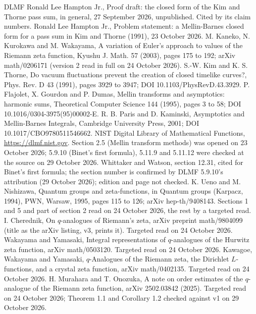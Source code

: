 \documentclass[11pt]{article}
\begin{document}
{\small\sloppy
\begin{thebibliography}{DLMF}
 Ronald Lee Hampton Jr., Proof draft: the closed form of the Kim and Thorne pass sum, in general, 27 September 2026, unpublished. Cited by its claim numbers.
 Ronald Lee Hampton Jr., Problem statement: a Mellin-Barnes closed form for a pass sum in Kim and Thorne (1991), 23 October 2026.
 M. Kaneko, N. Kurokawa and M. Wakayama, A variation of Euler's approach to values of the Riemann zeta function, Kyushu J. Math. 57 (2003), pages 175 to 192; arXiv math/0206171 (version 2 read in full on 24 October 2026).
 S.-W. Kim and K. S. Thorne, Do vacuum fluctuations prevent the creation of closed timelike curves?, Phys. Rev. D 43 (1991), pages 3929 to 3947; DOI 10.1103/PhysRevD.43.3929.
 P. Flajolet, X. Gourdon and P. Dumas, Mellin transforms and asymptotics: harmonic sums, Theoretical Computer Science 144 (1995), pages 3 to 58; DOI 10.1016/0304-3975(95)00002-E.
 R. B. Paris and D. Kaminski, Asymptotics and Mellin-Barnes Integrals, Cambridge University Press, 2001; DOI 10.1017/CBO9780511546662.
 NIST Digital Library of Mathematical Functions, \url{https://dlmf.nist.gov}. Section 2.5 (Mellin transform methods) was opened on 23 October 2026; 5.9.10 (Binet's first formula), 5.11.9 and 5.11.12 were checked at the source on 29 October 2026.
 Whittaker and Watson, section 12.31, cited for Binet's first formula; the section number is confirmed by DLMF 5.9.10's attribution (29 October 2026); edition and page not checked.
 K. Ueno and M. Nishizawa, Quantum groups and zeta-functions, in Quantum groups (Karpacz, 1994), PWN, Warsaw, 1995, pages 115 to 126; arXiv hep-th/9408143. Sections 1 and 5 and part of section 2 read on 24 October 2026, the rest by a targeted read.
 I. Cherednik, On $q$-analogues of Riemann's zeta, arXiv preprint math/9804099 (title as the arXiv listing, v3, prints it). Targeted read on 24 October 2026.
 Wakayama and Yamasaki, Integral representations of $q$-analogues of the Hurwitz zeta function, arXiv math/0503120. Targeted read on 24 October 2026.
 Kawagoe, Wakayama and Yamasaki, $q$-Analogues of the Riemann zeta, the Dirichlet $L$-functions, and a crystal zeta function, arXiv math/0402135. Targeted read on 24 October 2026.
 H. Murahara and T. Onozuka, A note on order estimates of the $q$-analogue of the Riemann zeta function, arXiv 2502.03842 (2025). Targeted read on 24 October 2026; Theorem 1.1 and Corollary 1.2 checked against v1 on 29 October 2026.

\end{thebibliography}}
\end{document}
